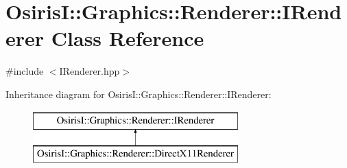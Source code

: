 \hypertarget{class_osiris_i_1_1_graphics_1_1_renderer_1_1_i_renderer}{\section{Osiris\-I\-:\-:Graphics\-:\-:Renderer\-:\-:I\-Renderer Class Reference}
\label{class_osiris_i_1_1_graphics_1_1_renderer_1_1_i_renderer}
}


{\ttfamily \#include $<$I\-Renderer.\-hpp$>$}

Inheritance diagram for Osiris\-I\-:\-:Graphics\-:\-:Renderer\-:\-:I\-Renderer\-:\begin{figure}[H]
\begin{center}
\leavevmode
\includegraphics[height=2.000000cm]{class_osiris_i_1_1_graphics_1_1_renderer_1_1_i_renderer}
\end{center}
\end{figure}
